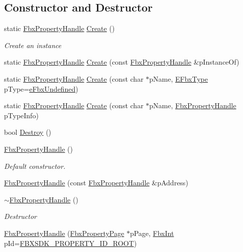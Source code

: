 \subsection*{Constructor and Destructor}
\begin{DoxyCompactItemize}
\item 
static \hyperlink{class_fbx_property_handle}{Fbx\+Property\+Handle} \hyperlink{class_fbx_property_handle_a347190a2078177d88598a7cd898eb811}{Create} ()
\begin{DoxyCompactList}\small\item\em Create an instance \end{DoxyCompactList}\item 
static \hyperlink{class_fbx_property_handle}{Fbx\+Property\+Handle} \hyperlink{class_fbx_property_handle_a0bd5893a117b68102c6ce852c6910859}{Create} (const \hyperlink{class_fbx_property_handle}{Fbx\+Property\+Handle} \&p\+Instance\+Of)
\item 
static \hyperlink{class_fbx_property_handle}{Fbx\+Property\+Handle} \hyperlink{class_fbx_property_handle_abaec4c3b07728510a42c9205fcdb2f53}{Create} (const char $\ast$p\+Name, \hyperlink{fbxpropertytypes_8h_a73913a5ddfb20e57c6f25e9e6784bd92}{E\+Fbx\+Type} p\+Type=\hyperlink{fbxpropertytypes_8h_a73913a5ddfb20e57c6f25e9e6784bd92a150b400dddd0f8b5c7e22a1bba0721d8}{e\+Fbx\+Undefined})
\item 
static \hyperlink{class_fbx_property_handle}{Fbx\+Property\+Handle} \hyperlink{class_fbx_property_handle_a4f3c6191091b367a05d58984a49e8229}{Create} (const char $\ast$p\+Name, \hyperlink{class_fbx_property_handle}{Fbx\+Property\+Handle} p\+Type\+Info)
\item 
bool \hyperlink{class_fbx_property_handle_ae7c07b84a008fbf8395375856a2b303a}{Destroy} ()
\item 
\hyperlink{class_fbx_property_handle_a6353ed814add637287bf3a86a4d097be}{Fbx\+Property\+Handle} ()
\begin{DoxyCompactList}\small\item\em Default constructor. \end{DoxyCompactList}\item 
\hyperlink{class_fbx_property_handle_ad95e794ff4c44aed3b73c6dabd4475da}{Fbx\+Property\+Handle} (const \hyperlink{class_fbx_property_handle}{Fbx\+Property\+Handle} \&p\+Address)
\item 
\hyperlink{class_fbx_property_handle_aaec3772d479b172d41c4b7585393fb14}{$\sim$\+Fbx\+Property\+Handle} ()
\begin{DoxyCompactList}\small\item\em Destructor \end{DoxyCompactList}\item 
\hyperlink{class_fbx_property_handle_adabd811d9e65f311dbbd5852abac7062}{Fbx\+Property\+Handle} (\hyperlink{class_fbx_property_page}{Fbx\+Property\+Page} $\ast$p\+Page, \hyperlink{fbxtypes_8h_a088fa96de3b0b3ea69f0f6afef525dfb}{Fbx\+Int} p\+Id=\hyperlink{fbxpropertydef_8h_a291bdb6d8428dce8463143fa3aba2c34}{F\+B\+X\+S\+D\+K\+\_\+\+P\+R\+O\+P\+E\+R\+T\+Y\+\_\+\+I\+D\+\_\+\+R\+O\+OT})
\end{DoxyCompactItemize}


